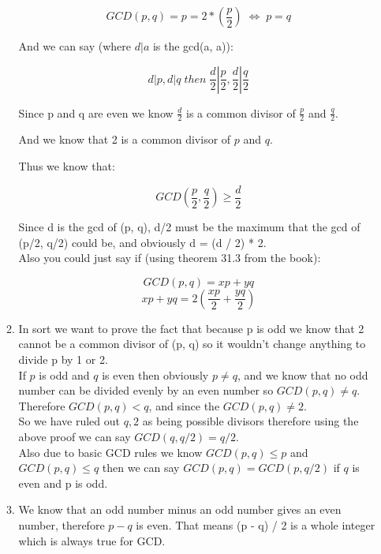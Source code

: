 \documentclass{article}
\DeclareRobustCommand\iff{\;\Longleftrightarrow\;}
\begin{document}
\begin{enumerate}
\begin{enumerate}
        \[GCD(p, q) = p = 2 * (\frac{p}{2}) \iff p = q\]

        And we can say (where $d|a$ is the gcd(a, a)):

        \[d|p, d|q\;then\;\frac{d}{2}|\frac{p}{2}, \frac{d}{2}|\frac{q}{2}\]

        Since p and q are even we know $\frac{d}{2}$ is a common divisor of $\frac{p}{2}$ and $\frac{q}{2}$.

        And we know that 2 is a common divisor of $p$ and $q$.

        Thus we know that:

        \[GCD(\frac{p}{2},\frac{q}{2}) \geq \frac{d}{2}\]

        Since d is the gcd of (p, q), d/2 must be the maximum that the gcd of (p/2, q/2) could be, and obviously d = (d / 2) * 2. \\

        Also you could just say if (using theorem 31.3 from the book):

        \[GCD(p, q) = xp + yq\]
        \[xp + yq = 2(\frac{xp}{2} + \frac{yq}{2})\]

        \item In sort we want to prove the fact that because p is odd we know that 2 cannot be a common divisor of (p, q) so it wouldn't change anything to divide p by 1 or 2.\\
        
        If $p$ is odd and $q$ is even then obviously $p \neq q$,
        and we know that no odd number can be divided evenly by an even number so $GCD(p, q) \neq q$.\\

        Therefore $GCD(p, q) < q$, and since the $GCD(p, q) \neq 2$.\\

        So we have ruled out $q, 2$ as being possible divisors therefore using the above proof we can say $GCD(q, q/2) = q/2$.\\

        Also due to basic GCD rules we know $GCD(p, q) \leq p$ and $GCD(p, q) \leq q$ then we can say $GCD(p, q) = GCD(p, q/2)$ if $q$ is even and p is odd. 

        \item We know that an odd number minus an odd number gives an even number, therefore $p - q$ is even. That means (p - q) / 2 is a whole integer which is always true for GCD.\\
        

\end{enumerate}
\end{enumerate}
\end{document}
